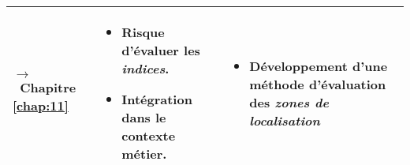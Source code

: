 \begin{tabular}{L{.2\textheight}L{.35\textheight}L{.35\textheight}}
{\par\footnotesize\hspace{.25cm}$\longrightarrow$~Chapitre
\ref{chap:11}} & \begin{minipage}{.35\textheight} \small
    \begin{itemize}
    \item Risque d'évaluer les \emph{indices}.
    \item Intégration dans le contexte métier.
    \end{itemize}
  \end{minipage}& \begin{minipage}{.35\textheight}
    \begin{itemize}
    \item Développement d'une méthode d'évaluation des \emph{zones de
        localisation}
    \end{itemize}
  \end{minipage}\\
  
  \bottomrule
\end{tabular}
